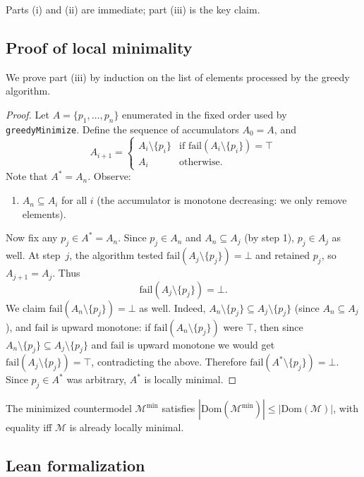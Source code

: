 \documentclass[11pt]{article}
\newcommand{\CMod}{\mathcal{M}}            %
\newcommand{\CMin}{\mathcal{M}^{\min}}     %
\newcommand{\Dom}{\mathrm{Dom}}            %
\newcommand{\Fail}{\mathrm{fail}}          %
\begin{document}
\noindent
Parts (i) and (ii) are immediate; part (iii) is the key claim.

\subsection{Proof of local minimality}

We prove part (iii) by induction on the list of elements processed
by the greedy algorithm.

\begin{proof}
Let $A = \{p_1, \ldots, p_n\}$ enumerated in the fixed order used by
\texttt{greedyMinimize}.  Define the sequence of accumulators
$A_0 = A$, and
\[
  A_{i+1} = \begin{cases}
    A_i \setminus \{p_i\} & \text{if } \Fail(A_i \setminus \{p_i\}) = \top \\
    A_i                   & \text{otherwise.}
  \end{cases}
\]
Note that $A^* = A_n$.  Observe:
\begin{enumerate}
  \item $A_n \subseteq A_i$ for all $i$ (the accumulator is monotone
        decreasing: we only remove elements).
\end{enumerate}

Now fix any $p_j \in A^* = A_n$.  Since $p_j \in A_n$ and
$A_n \subseteq A_j$ (by step 1), $p_j \in A_j$ as well.  At step~$j$,
the algorithm tested $\Fail(A_j \setminus \{p_j\}) = \bot$ and
retained $p_j$, so $A_{j+1} = A_j$.  Thus
\[
  \Fail(A_j \setminus \{p_j\}) = \bot.
\]
We claim $\Fail(A_n \setminus \{p_j\}) = \bot$ as well.  Indeed,
$A_n \setminus \{p_j\} \subseteq A_j \setminus \{p_j\}$ (since
$A_n \subseteq A_j$), and $\Fail$ is upward monotone: if
$\Fail(A_n \setminus \{p_j\})$ were $\top$, then since
$A_n \setminus \{p_j\} \subseteq A_j \setminus \{p_j\}$ and $\Fail$
is upward monotone we would get
$\Fail(A_j \setminus \{p_j\}) = \top$, contradicting the above.
Therefore $\Fail(A^* \setminus \{p_j\}) = \bot$.
Since $p_j \in A^*$ was arbitrary, $A^*$ is locally minimal.
\end{proof}

\begin{corollary}\label{cor:min-size}
The minimized countermodel $\CMin$ satisfies
$|\Dom(\CMin)| \leq |\Dom(\CMod)|$, with equality iff $\CMod$ is
already locally minimal.
\end{corollary}

\subsection{Lean formalization}
\end{document}
